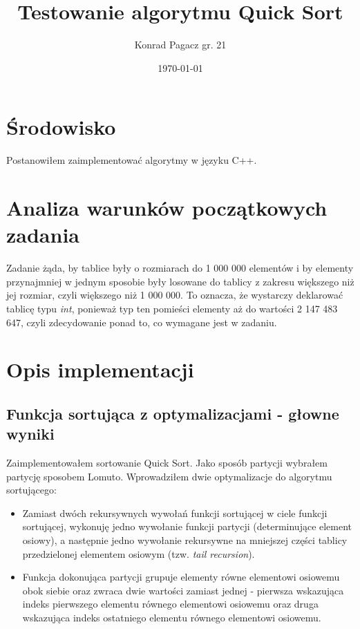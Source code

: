 \documentclass{article}
\title{Testowanie algorytmu Quick Sort}
\author{Konrad Pagacz gr. 21}
\date\today
\begin{document}
\maketitle %

\section{Środowisko}
Postanowiłem zaimplementować algorytmy w języku C++.

\section{Analiza warunków początkowych zadania}
Zadanie żąda, by tablice były o rozmiarach do 1 000 000 elementów i by elementy przynajmniej w jednym sposobie były losowane do tablicy z zakresu większego niż jej rozmiar, czyli większego niż 1 000 000. To oznacza, że wystarczy deklarować tablicę typu \textit{int}, ponieważ typ ten pomieści elementy aż do wartości 2 147 483 647, czyli zdecydowanie ponad to, co wymagane jest w zadaniu. 

\section{Opis implementacji}
    \subsection{Funkcja sortująca z optymalizacjami - głowne wyniki}
    Zaimplementowałem sortowanie Quick Sort. Jako sposób partycji wybrałem partycję sposobem Lomuto. Wprowadziłem dwie optymalizacje do algorytmu sortującego:
    \begin{itemize}
        \item {Zamiast dwóch rekursywnych wywołań funkcji sortującej w ciele funkcji sortującej, wykonuję jedno wywołanie funkcji partycji (determinujące element osiowy), a następnie jedno wywołanie rekursywne na mniejszej części tablicy przedzielonej elementem osiowym (tzw. \textit{tail recursion}).}
        \item {Funkcja dokonująca partycji grupuje elementy równe elementowi osiowemu obok siebie oraz zwraca dwie wartości zamiast jednej - pierwsza wskazująca indeks pierwszego elementu równego elementowi osiowemu oraz druga wskazująca indeks ostatniego elementu równego elementowi osiowemu.}
    \end{itemize}
    
\end{document}
